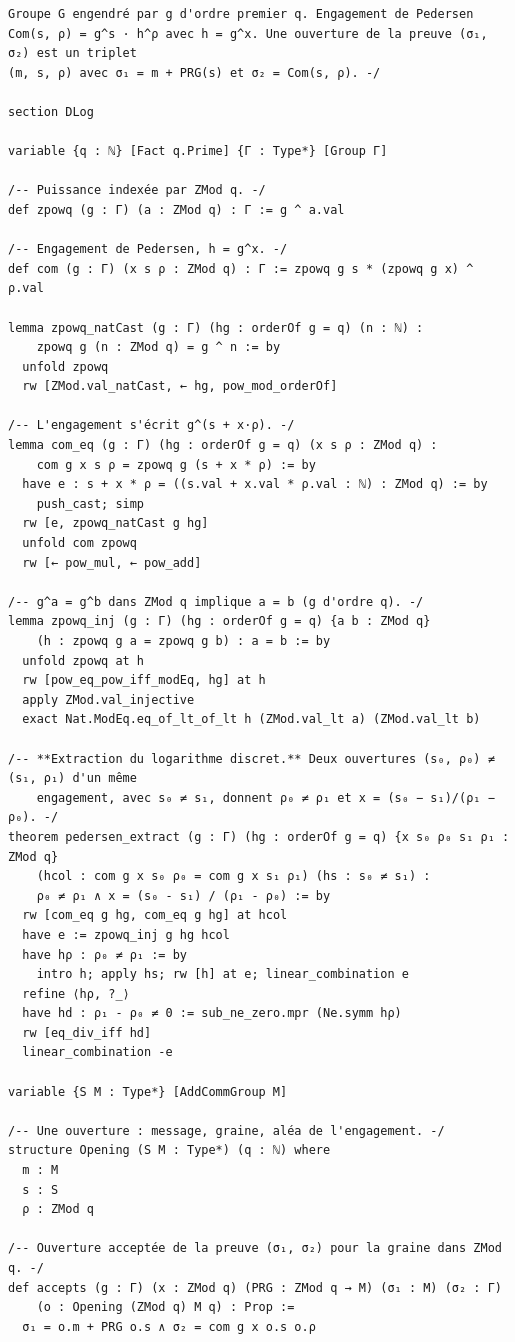 \begin{lstlisting}[caption={M\'ecanisation r\'eduite des r\'eductions de SOTP-Low (version 1.0)}, label={lst:gamebased_lean}, language=Lean4]
Groupe G engendré par g d'ordre premier q. Engagement de Pedersen
Com(s, ρ) = g^s · h^ρ avec h = g^x. Une ouverture de la preuve (σ₁, σ₂) est un triplet
(m, s, ρ) avec σ₁ = m + PRG(s) et σ₂ = Com(s, ρ). -/

section DLog

variable {q : ℕ} [Fact q.Prime] {Γ : Type*} [Group Γ]

/-- Puissance indexée par ZMod q. -/
def zpowq (g : Γ) (a : ZMod q) : Γ := g ^ a.val

/-- Engagement de Pedersen, h = g^x. -/
def com (g : Γ) (x s ρ : ZMod q) : Γ := zpowq g s * (zpowq g x) ^ ρ.val

lemma zpowq_natCast (g : Γ) (hg : orderOf g = q) (n : ℕ) :
    zpowq g (n : ZMod q) = g ^ n := by
  unfold zpowq
  rw [ZMod.val_natCast, ← hg, pow_mod_orderOf]

/-- L'engagement s'écrit g^(s + x·ρ). -/
lemma com_eq (g : Γ) (hg : orderOf g = q) (x s ρ : ZMod q) :
    com g x s ρ = zpowq g (s + x * ρ) := by
  have e : s + x * ρ = ((s.val + x.val * ρ.val : ℕ) : ZMod q) := by
    push_cast; simp
  rw [e, zpowq_natCast g hg]
  unfold com zpowq
  rw [← pow_mul, ← pow_add]

/-- g^a = g^b dans ZMod q implique a = b (g d'ordre q). -/
lemma zpowq_inj (g : Γ) (hg : orderOf g = q) {a b : ZMod q}
    (h : zpowq g a = zpowq g b) : a = b := by
  unfold zpowq at h
  rw [pow_eq_pow_iff_modEq, hg] at h
  apply ZMod.val_injective
  exact Nat.ModEq.eq_of_lt_of_lt h (ZMod.val_lt a) (ZMod.val_lt b)

/-- **Extraction du logarithme discret.** Deux ouvertures (s₀, ρ₀) ≠ (s₁, ρ₁) d'un même
    engagement, avec s₀ ≠ s₁, donnent ρ₀ ≠ ρ₁ et x = (s₀ − s₁)/(ρ₁ − ρ₀). -/
theorem pedersen_extract (g : Γ) (hg : orderOf g = q) {x s₀ ρ₀ s₁ ρ₁ : ZMod q}
    (hcol : com g x s₀ ρ₀ = com g x s₁ ρ₁) (hs : s₀ ≠ s₁) :
    ρ₀ ≠ ρ₁ ∧ x = (s₀ - s₁) / (ρ₁ - ρ₀) := by
  rw [com_eq g hg, com_eq g hg] at hcol
  have e := zpowq_inj g hg hcol
  have hρ : ρ₀ ≠ ρ₁ := by
    intro h; apply hs; rw [h] at e; linear_combination e
  refine ⟨hρ, ?_⟩
  have hd : ρ₁ - ρ₀ ≠ 0 := sub_ne_zero.mpr (Ne.symm hρ)
  rw [eq_div_iff hd]
  linear_combination -e

variable {S M : Type*} [AddCommGroup M]

/-- Une ouverture : message, graine, aléa de l'engagement. -/
structure Opening (S M : Type*) (q : ℕ) where
  m : M
  s : S
  ρ : ZMod q

/-- Ouverture acceptée de la preuve (σ₁, σ₂) pour la graine dans ZMod q. -/
def accepts (g : Γ) (x : ZMod q) (PRG : ZMod q → M) (σ₁ : M) (σ₂ : Γ)
    (o : Opening (ZMod q) M q) : Prop :=
  σ₁ = o.m + PRG o.s ∧ σ₂ = com g x o.s o.ρ


\end{lstlisting}
